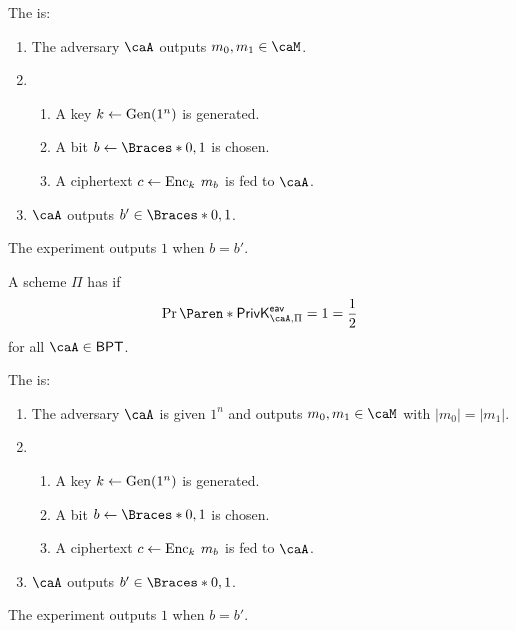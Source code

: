 \documentclass[a5paper]{article}
\begin{document}
\begin{definition*}
  The  is:
  \begin{enumerate}%
    \itemsep0em
    \item The adversary $\caA$ outputs $m_0,m_1\in\caM$.
    \item
      \begin{enumerate}%
        \itemsep0em
        \item A key $k\leftarrow\operatorname{Gen}(1^n)$ is generated.
        \item A bit $b\leftarrow \braces{0,1}$ is chosen.
        \item A ciphertext $c\leftarrow\operatorname{Enc}_k\hspace{0.23em} m_b$ is fed to $\caA$.
      \end{enumerate}
    \item $\caA$ outputs $b'\in\braces{0,1}$.
  \end{enumerate}
  The experiment outputs $1$ when $b=b'$.
\end{definition*}

\begin{definition*}
	A scheme $\Pi$ has  if
  \begin{equation*}
    \Pr\paren{\mathsf{PrivK}^{\mathsf{eav}}_{\caA,\Pi}=1}=\frac 12
  \end{equation*}
  for all $\caA\in\mathsf{BPT}$.
\end{definition*}

\begin{definition*}
  The  is:
  \begin{enumerate}%
    \itemsep0em
    \item The adversary $\caA$ is given $1^n$ and outputs $m_0,m_1\in\caM$ with
      $|m_0|=|m_1|$.
    \item
      \begin{enumerate}%
        \itemsep0em
        \item A key $k\leftarrow\operatorname{Gen}(1^n)$ is generated.
        \item A bit $b\leftarrow \braces{0,1}$ is chosen.
        \item A ciphertext $c\leftarrow\operatorname{Enc}_k\hspace{0.23em} m_b$ is fed to $\caA$.
      \end{enumerate}
    \item $\caA$ outputs $b'\in\braces{0,1}$.
  \end{enumerate}
  The experiment outputs $1$ when $b=b'$.
\end{definition*}
\end{document}
